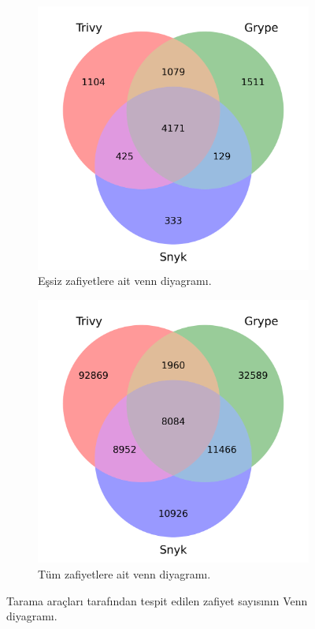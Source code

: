 \begin{figure}[!htbp]
	\centering
	\begin{subfigure}[Figure A]{\linewidth/2}
		\includegraphics[width=1\linewidth]{images/s1/vulCountsVennUniq.png}
		\caption{Eşsiz zafiyetlere ait venn diyagramı.}\label{fig:vulCountsVennUniq}
	\end{subfigure}%
	\begin{subfigure}[Figure A]{\linewidth/2}
		\includegraphics[width=1\linewidth]{images/s1/vulCountsVenn.png}
		\caption{Tüm zafiyetlere ait venn diyagramı.}\label{fig:vulCountsVenn}
	\end{subfigure}

	\caption{Tarama araçları tarafından tespit edilen zafiyet sayısının Venn diyagramı.}\label{fig:fig2}
\end{figure}


